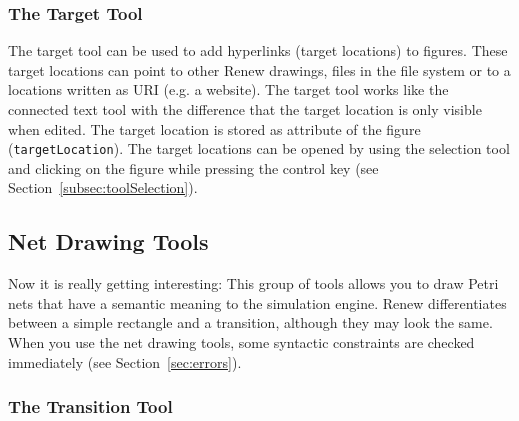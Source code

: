 \subsubsection{The Target Tool}
\label{subsubsec:toolTarget}

The target tool can be used to add hyperlinks (target locations) to figures. These target locations can point to other Renew drawings, files in the file system or to a locations written as URI (e.g. a website). The target tool works like the connected text tool with the difference that the target location is only visible when edited. The target location is stored as attribute of the figure (\texttt{targetLocation}). The target locations can be opened by using the selection tool and clicking on the figure while pressing the control key (see Section~\ref{subsec:toolSelection}).



\subsection{Net Drawing Tools}

Now it is really getting interesting:
This group of tools allows you to draw Petri nets that have a
semantic meaning to the simulation engine.
Renew differentiates between a simple rectangle and a transition,
although they may look the same.
When you use the net drawing tools, some syntactic constraints
are checked immediately (see Section~\ref{sec:errors}).


\subsubsection{The Transition Tool}
\label{subsubsec:toolTransition}

